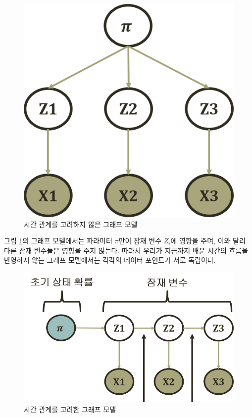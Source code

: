 \documentclass[a4paper]{oblivoir}
\begin{document}
\begin{figure}[ht] \centering 
\includegraphics[scale=0.6]{fig9_4.png} 
\caption{시간 관계를 고려하지 않은 그래프 모델}
\label{fig:9-4}
\end{figure}

그림 \ref{fig:9-4}의 그래프 모델에서는 파라미터 $\pi$만이 잠재 변수 $Z_i$에 영향을 주며, 이와 달리 다른 잠재 변수들은 영향을 주지 않는다. 따라서 우리가 지금까지 배운 시간의 흐름을 반영하지 않는 그래프 모델에서는 각각의 데이터 포인트가 서로 독립이다. \\

\begin{figure}[ht] \centering 
\includegraphics[scale=0.6]{fig9_5.png} 
\caption{시간 관계를 고려한 그래프 모델}
\label{fig:9-5}
\end{figure}
\end{document}
